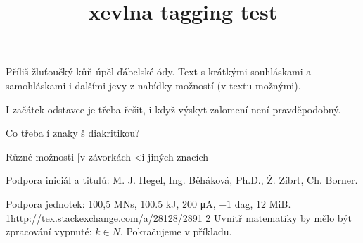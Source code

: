 \documentclass{article}
\title{xevlna tagging test}
\begin{document}
Příliš žluťoučký kůň úpěl ďábelské ódy.
Text s krátkými souhláskami a samohláskami i dalšími jevy
z nabídky možností (v textu možnými).

I začátek odstavce je třeba řešit, i když výskyt zalomení
není pravděpodobný.

Co třeba í znaky š diakritikou?

Různé možnosti [v závorkách <i jiných znacích

Podpora iniciál a titulů: M. J. Hegel, Ing. Běháková, Ph.D., Ž. Zíbrt,
Ch. Borner.

Podpora jednotek: 100,5 MN\textperiodcentered s, 100.5 kJ, 200 μA, $-1$ dag,
12 MiB.
1http://tex.stackexchange.com/a/28128/2891
2
Uvnitř matematiky by mělo být zpracování vypnuté: $k \in N$.
Pokračujeme v příkladu.
\end{document}
